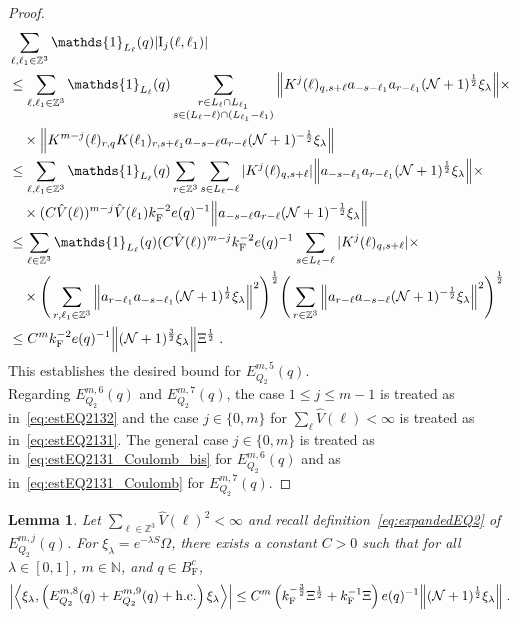 \documentclass[12pt,a4paper]{article}
\numberwithin{equation}{section}
\newcommand{\NNN}{\mathbb{N}}
\newcommand{\1}{\mathbb{I}}
\newcommand{\F}{\mathrm{F}}
\newcommand{\I}{\mathrm{I}}
\newcommand{\Zstar}{\mathbb{Z}^3} %
\newcommand{\Z}{\mathbb{Z}}
\newcommand{\NN}{\mathcal{N}}
\newcommand{\half}{\frac{1}{2}}
\newcommand{\eva}[1]{\left\langle #1 \right\rangle}
\theoremstyle{plain}
\newtheorem{lemma}[theorem]{Lemma}
\theoremstyle{definition}
\theoremstyle{remark}
\theoremstyle{plain}
\theoremstyle{definition}
\theoremstyle{remark}
\begin{document}
\begin{proof}
\begin{align}
	&\sum_{\ell,\ell_1 \in \Zstar} \mathds{1}_{L_\ell}(q) |\I_j(\ell, \ell_1)| \nonumber\\
	&\leq \sum_{\ell,\ell_1 \in \Zstar} \mathds{1}_{L_\ell}(q) \sum\limits_{\substack{r\in L_{\ell} \cap L_{\ell_1}\\ s \in (L_{\ell} - \ell) \cap (L_{\ell_1} - \ell_1)}}
		\norm{ K^{j}(\ell)_{q,s+\ell} a_{-s-\ell_1} a_{r-\ell_1} (\NN+1)^{\half} \xi_\lambda} \nonumber \times \\ 
	&\quad \times \norm{ K^{m-j}(\ell)_{r,q} K(\ell_1)_{r,s+\ell_1} a_{-s-\ell}a_{r-\ell} (\NN+1)^{-\half} \xi_\lambda } \nonumber\\
	&\leq \sum_{\ell,\ell_1 \in \Zstar} \mathds{1}_{L_\ell}(q)
		\sum_{r\in \Z^3} \sum_{s \in L_{\ell} - \ell}
		|K^{j}(\ell)_{q,s+\ell}|
		\norm{ a_{-s-\ell_1} a_{r-\ell_1} (\NN+1)^{\half} \xi_\lambda} \times \nonumber\\
	&\quad \times (C \hat{V}(\ell))^{m-j} \hat{V}(\ell_1) k_{\F}^{-2} e(q)^{-1}
		\norm{ a_{-s-\ell}a_{r-\ell} (\NN+1)^{-\half} \xi_\lambda } \nonumber\\
	&\leq \sum_{\ell \in \Zstar} \mathds{1}_{L_\ell}(q) (C \hat{V}(\ell))^{m-j} k_{\F}^{-2} e(q)^{-1}
		\sum_{s \in L_{\ell} - \ell}
		|K^{j}(\ell)_{q,s+\ell}| \times \nonumber\\
	&\quad \times \Bigg( \sum_{r,\ell_1 \in \Z^3} \norm{a_{r-\ell_1} a_{-s-\ell_1} (\NN+1)^{\half} \xi_\lambda}^2 \Bigg)^{\half}
		\Bigg( \sum_{r \in \Z^3} \norm{a_{r-\ell} a_{-s-\ell} (\NN+1)^{-\half} \xi_\lambda }^2 \Bigg)^{\half} \nonumber\\
	&\leq C^m k_{\F}^{-2} e(q)^{-1}
		\norm{(\NN+1)^{\frac 32} \xi_\lambda} \Xi^{\half} \;. \label{eq:estEQ2132}
\end{align} 
This establishes the desired bound for $ E^{m,5}_{Q_2}(q) $.\\
Regarding $ E^{m,6}_{Q_2}(q) $ and $ E^{m,7}_{Q_2}(q) $, the case $ 1 \le j \le m-1 $ is treated as in~\eqref{eq:estEQ2132} and the case $ j \in \{0,m\} $ for $ \sum_\ell \hat{V}(\ell) < \infty $ is treated as in~\eqref{eq:estEQ2131}. The general case $ j \in \{0,m\} $ is treated as in~\eqref{eq:estEQ2131_Coulomb_bis} for $ E^{m,6}_{Q_2}(q) $ and as in~\eqref{eq:estEQ2131_Coulomb} for $ E^{m,7}_{Q_2}(q) $. 
\end{proof}


\begin{lemma} \label{lem:EQ218}
Let $ \sum_{\ell \in \Zstar} \hat{V}(\ell)^2 < \infty $ and recall definition~\eqref{eq:expandedEQ2} of $ E_{Q_2}^{m,j}(q) $. For $\xi_\lambda = e^{-\lambda S} \Omega$, there exists a constant $ C > 0 $ such that for all $ \lambda \in [0,1] $, $ m \in \NNN $, and $ q \in B_{\F}^c $,
\begin{align}
	\abs{\eva{\xi_\lambda,\left(E^{m,8}_{Q_2}(q) + E^{m,9}_{Q_2}(q) + \mathrm{h.c.}\right) \xi_\lambda }}
	\leq C^m \left( k_{\F}^{-\frac 32} \Xi^\half
		+ k_{\F}^{-1} \Xi \right)
		e(q)^{-1} \norm{(\NN+1)^{\half} \xi_\lambda} \;.\label{eq:estEQ218}
\end{align}
\end{lemma}
\end{document}
